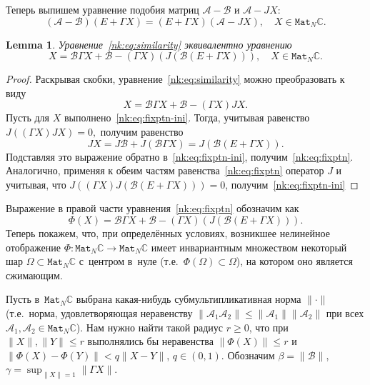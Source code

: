\documentclass[14pt,a4paper]{extarticle}
\newtheorem{lem}{Lemma}
\theoremstyle{definition}
\begin{document}
Теперь выпишем уравнение подобия матриц \( \mathcal{A} - \mathcal{B} \)
и \( \mathcal{A} - J X \):
\begin{equation}\label{nk:eq:similarity}
    (\mathcal{A-B})(E+\Gamma X) = (E+\Gamma X)(\mathcal{A} - J X), \quad X\in\mathtt{Mat}_N\mathbb{C}.
\end{equation}
\begin{lem}
    Уравнение~\eqref{nk:eq:similarity} эквивалентно уравнению
    \begin{equation}\label{nk:eq:fixptn}
        X = \mathcal{B} \Gamma X + \mathcal{B} - (\Gamma X)(J(\mathcal{B} (E + \Gamma X))), \quad X\in\mathtt{Mat}_N\mathbb{C}.
    \end{equation}
\end{lem}
\begin{proof}
Раскрывая скобки, уравнение~\eqref{nk:eq:similarity} можно преобразовать к виду
\begin{equation}\label{nk:eq:fixptn-ini}
    X = \mathcal{B} \Gamma X + \mathcal{B} - (\Gamma X) J X.
\end{equation}
Пусть для \( X \) выполнено~\eqref{nk:eq:fixptn-ini}.
Тогда, учитывая равенство \( J\left((\Gamma X)JX\right) = 0, \)
получим равенство
    \begin{equation}\label{nk:eq:jx}
        J X = J\mathcal{B} + J\left(\mathcal{B}\Gamma X\right) = J(\mathcal{B} (E + \Gamma X)).
    \end{equation}
Подставляя это выражение обратно в~\eqref{nk:eq:fixptn-ini},
    получим~\eqref{nk:eq:fixptn}.
Аналогично, применяя к обеим частям равенства~\eqref{nk:eq:fixptn} оператор \( J \)
    и учитывая, что \( J\left( (\Gamma X)J(\mathcal{B} (E + \Gamma X)) \right) = 0 \),
    получим~\eqref{nk:eq:fixptn-ini}
\end{proof}

Выражение в правой части уравнения~\eqref{nk:eq:fixptn} обозначим как
\[
    \Phi(X) = \mathcal{B} \Gamma X + \mathcal{B} - (\Gamma X)(J(\mathcal{B} (E + \Gamma X))).\]
Теперь покажем, что, при определ\"енных условиях,
возникшее нелинейное отображение \( \Phi:\mathtt{Mat}_N\mathbb{C}\to \mathtt{Mat}_N\mathbb{C} \) имеет инвариантным множеством
некоторый шар \( \Omega \subset \mathtt{Mat}_N\mathbb{C} \) с~центром в~нуле
(т.е.~\( \Phi(\Omega)\subset\Omega \)),
на котором оно является сжимающим.

Пусть в~\( \mathtt{Mat}_N\mathbb{C} \)
выбрана какая-нибудь субмультипликативная норма \( \|\cdot\| \)
(т.е.~норма, удовлетворяющая неравенству
 \( \| \mathcal{A}_1\mathcal{A}_2 \| \leq \|\mathcal{A}_1\|\|\mathcal{A}_2\| \)
 при всех \( \mathcal{A}_1, \mathcal{A}_2 \in \mathtt{Mat}_N\mathbb{C} \)).
Нам нужно найти такой радиус \( r \geq 0 \),
что при \( \|X\|,\|Y\| \leq r \) выполнялись бы неравенства \( \|\Phi(X)\| \leq r \)
и~\( \|\Phi(X) - \Phi(Y)\| < q\|X-Y\| \), \( q\in(0,1) \).
Обозначим
\( \beta = \|\mathcal{B}\| \), \( \gamma = \sup_{\|X\|=1} \|\Gamma X\| \).
\end{document}
